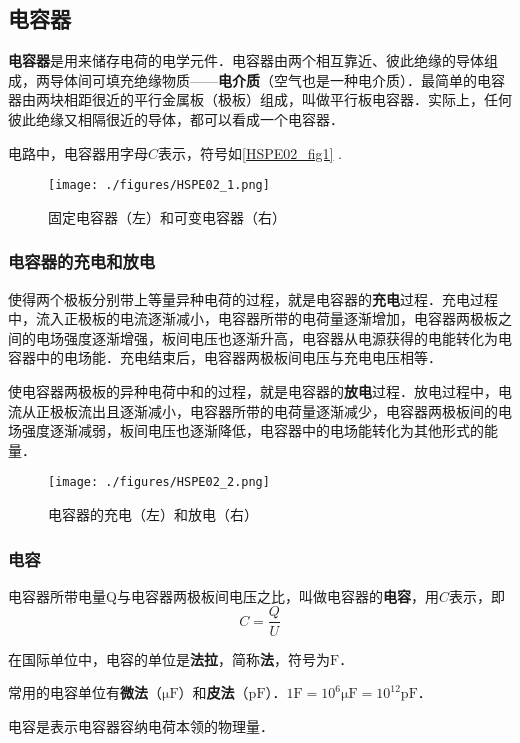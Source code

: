
\begin{issues}
\issueDraft
\issueTODO
\end{issues}


\subsection{电容器}

\textbf{电容器}是用来储存电荷的电学元件．电容器由两个相互靠近、彼此绝缘的导体组成，两导体间可填充绝缘物质——\textbf{电介质}（空气也是一种电介质）．最简单的电容器由两块相距很近的平行金属板（极板）组成，叫做平行板电容器．实际上，任何彼此绝缘又相隔很近的导体，都可以看成一个电容器．

电路中，电容器用字母$C$表示，符号如\autoref{HSPE02_fig1} .

\begin{figure}[ht]
\centering
\texttt{[image: ./figures/HSPE02\_1.png]}
\caption{固定电容器（左）和可变电容器（右）} \label{HSPE02_fig1}
\end{figure}

\subsubsection{电容器的充电和放电}

使得两个极板分别带上等量异种电荷的过程，就是电容器的\textbf{充电}过程．充电过程中，流入正极板的电流逐渐减小，电容器所带的电荷量逐渐增加，电容器两极板之间的电场强度逐渐增强，板间电压也逐渐升高，电容器从电源获得的电能转化为电容器中的电场能．充电结束后，电容器两极板间电压与充电电压相等．

使电容器两极板的异种电荷中和的过程，就是电容器的\textbf{放电}过程．放电过程中，电流从正极板流出且逐渐减小，电容器所带的电荷量逐渐减少，电容器两极板间的电场强度逐渐减弱，板间电压也逐渐降低，电容器中的电场能转化为其他形式的能量．

\begin{figure}[ht]
\centering
\texttt{[image: ./figures/HSPE02\_2.png]}
\caption{电容器的充电（左）和放电（右）} \label{HSPE02_fig2}
\end{figure}

\subsubsection{电容}

电容器所带电量Q与电容器两极板间电压之比，叫做电容器的\textbf{电容}，用$C$表示，即
\begin{equation}
C=\frac{Q}{U}
\end{equation}

在国际单位中，电容的单位是\textbf{法拉}，简称\textbf{法}，符号为$\mathrm{F}$．

常用的电容单位有\textbf{微法}（$\mathrm{\mu F}$）和\textbf{皮法}（$\mathrm{pF}$）．$1\mathrm{F}=10^6 \mathrm{\mu F}=10^{12} \mathrm{pF}$．

电容是表示电容器容纳电荷本领的物理量．
